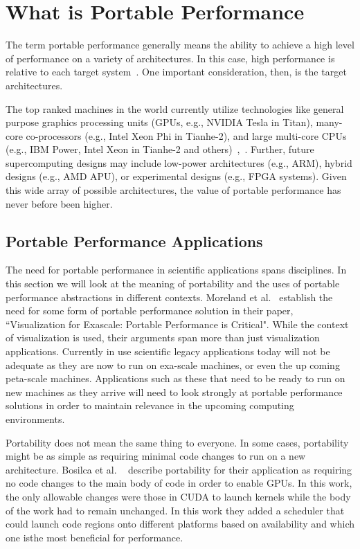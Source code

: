 \section{\textbf{What is Portable Performance}}
\label{sec:whatispp}

The term portable performance generally means the ability to achieve a high level of performance on a variety of architectures.
%
In this case, high performance is relative to each target system~\cite{michaelwolfe2016}.
%
One important consideration, then, is the target architectures.
%

%
The top ranked machines in the world currently utilize technologies like general purpose graphics processing units (GPUs, e.g., NVIDIA Tesla in Titan), many-core co-processors (e.g., Intel Xeon Phi in Tianhe-2), and large multi-core CPUs (e.g., IBM Power, Intel Xeon in Tianhe-2 and others)~\cite{michaelwolfe2016},~\cite{top500thelist2016}. 
%
Further, future supercomputing designs may include low-power architectures (e.g., ARM), hybrid designs (e.g., AMD APU), or experimental designs (e.g., FPGA systems). 
%
Given this wide array of possible architectures, the value of portable performance has never before been higher.
%

\subsection{\textbf{Portable Performance Applications}}

The need for portable performance in scientific applications spans disciplines.
%
In this section we will look at the meaning of portability and the uses of portable performance abstractions in different contexts.
%
Moreland et al.~\cite{moreland2015visualization} establish the need for some form of portable performance solution in their paper, ``Visualization for Exascale: Portable Performance is Critical".
%
While the context of visualization is used, their arguments span more than just visualization applications.
%
Currently in use scientific legacy applications today will not be adequate as they are now to run on exa-scale machines, or even the up coming peta-scale machines.
%
Applications such as these that need to be ready to run on new machines as they arrive will need to look strongly at portable performance solutions in order to maintain relevance in the upcoming computing environments.

Portability does not mean the same thing to everyone.
%
In some cases, portability might be as simple as requiring minimal code changes to run on a new architecture.
%
Bosilca et al. ~\cite{bosilca2011performance} describe portability for their application as requiring no code changes to the main body of code in order to enable GPUs.
%
In this work, the only allowable changes were those in CUDA to launch kernels while the body of the work had to remain unchanged.
%
In this work they added a scheduler that could launch code regions onto different platforms based on availability and which one isthe most beneficial for performance.

